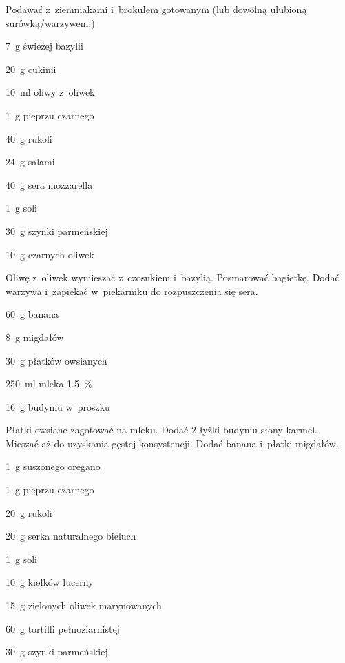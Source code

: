 \documentclass[../main.tex]{subfiles}
\begin{document}
Podawać z~ziemniakami i~brokułem gotowanym (lub dowolną ulubioną
surówką/warzywem.)


\begin{Ingred}
    \item \qty{7}{\gram} świeżej bazylii
    \item \qty{20}{\gram} cukinii
    \item \qty{10}{\milli\litre} oliwy z~oliwek
    \item \qty{1}{\gram} pieprzu czarnego
    \item \qty{40}{\gram} rukoli
    \item \qty{24}{\gram} salami
    \item \qty{40}{\gram} sera mozzarella
    \item \qty{1}{\gram} soli
    \item \qty{30}{\gram} szynki parmeńskiej
    \item \qty{10}{\gram} czarnych oliwek
\end{Ingred}

Oliwę z~oliwek wymieszać z~czosnkiem i~bazylią. Posmarować bagietkę. Dodać
warzywa i~zapiekać w~piekarniku do rozpuszczenia się sera.


\begin{Ingred}
    \item \qty{60}{\gram} banana
    \item \qty{8}{\gram} migdałów
    \item \qty{30}{\gram} płatków owsianych
    \item \qty{250}{\milli\litre} mleka \qty{1.5}{\percent}
    \item \qty{16}{\gram} budyniu w~proszku
\end{Ingred}

Płatki owsiane zagotować na mleku. Dodać \num{2} łyżki budyniu słony karmel.
Mieszać aż do uzyskania gęstej konsystencji. Dodać banana i~płatki migdałów.


\begin{Ingred}
    \item \qty{1}{\gram} suszonego oregano
    \item \qty{1}{\gram} pieprzu czarnego
    \item \qty{20}{\gram} rukoli
    \item \qty{20}{\gram} serka naturalnego bieluch
    \item \qty{1}{\gram} soli
    \item \qty{10}{\gram} kiełków lucerny
    \item \qty{15}{\gram} zielonych oliwek marynowanych
    \item \qty{60}{\gram} tortilli pełnoziarnistej
    \item \qty{30}{\gram} szynki parmeńskiej
\end{Ingred}
\end{document}
